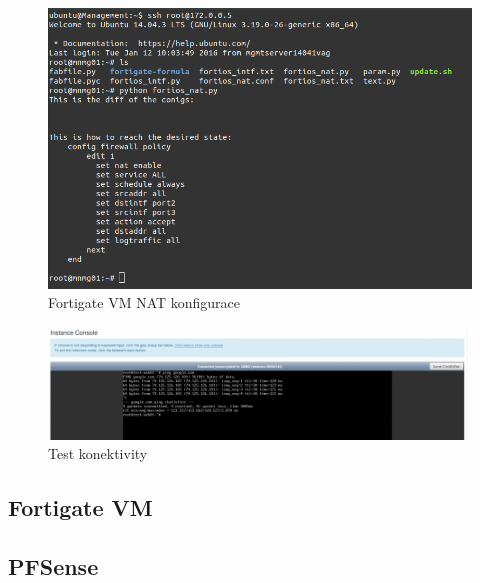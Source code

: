 \begin{figure}[h]
\begin{centering}
\includegraphics[scale=0.45]{images/fortigate_nat}
\par\end{centering}
\caption{Fortigate VM NAT konfigurace\label{fig:fortigate_nat}}
\end{figure}

\begin{figure}[h]
\begin{centering}
\includegraphics[scale=0.45]{images/fortigate_ping}
\par\end{centering}
\caption{Test konektivity\label{fig:fortigate_ping}}
\end{figure}


\subsection{Fortigate VM}

\subsection{PFSense}